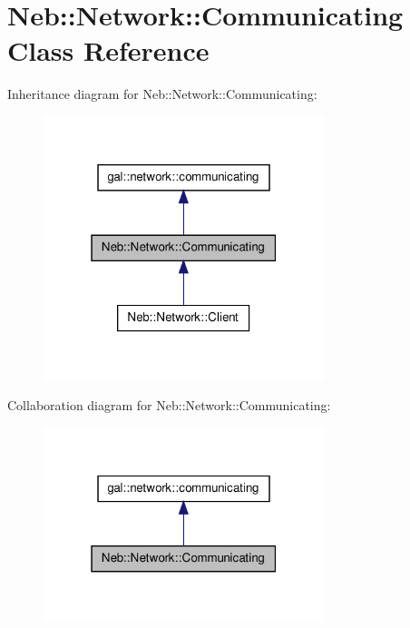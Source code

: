 \hypertarget{classNeb_1_1Network_1_1Communicating}{\section{\-Neb\-:\-:\-Network\-:\-:\-Communicating \-Class \-Reference}
\label{classNeb_1_1Network_1_1Communicating}
}


\-Inheritance diagram for \-Neb\-:\-:\-Network\-:\-:\-Communicating\-:\nopagebreak
\begin{figure}[H]
\begin{center}
\leavevmode
\includegraphics[width=232pt]{classNeb_1_1Network_1_1Communicating__inherit__graph}
\end{center}
\end{figure}


\-Collaboration diagram for \-Neb\-:\-:\-Network\-:\-:\-Communicating\-:\nopagebreak
\begin{figure}[H]
\begin{center}
\leavevmode
\includegraphics[width=232pt]{classNeb_1_1Network_1_1Communicating__coll__graph}
\end{center}
\end{figure}
